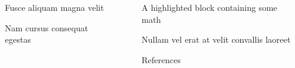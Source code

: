 \documentclass[final]{beamer}
\newlength{\sepwidth}
\newlength{\colwidth}
\newcommand{\separatorcolumn}{\begin{column}{\sepwidth}\end{column}}
\begin{document}
\begin{frame}[t]
\begin{columns}[t]
\begin{column}{\colwidth}
  \begin{block}{Fusce aliquam magna velit}


  \end{block}

  \begin{block}{Nam cursus consequat egestas}


  \end{block}

\end{column}

\separatorcolumn

\begin{column}{\colwidth}

  \begin{exampleblock}{A highlighted block containing some math}



  \end{exampleblock}

  \begin{block}{Nullam vel erat at velit convallis laoreet}


  \end{block}

  \begin{block}{References}

    \nocite{*}
    \footnotesize{}

  \end{block}

\end{column}

\separatorcolumn
\end{columns}
\end{frame}
\end{document}

